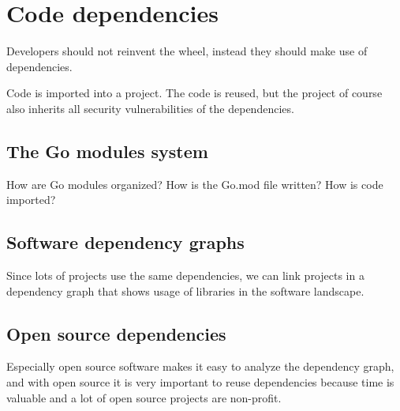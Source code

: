 
\chapter{Code dependencies}\label{ch:code-dependencies}

Developers should not reinvent the wheel, instead they should make use of dependencies.

Code is imported into a project. The code is reused, but the project of course also inherits
all security vulnerabilities of the dependencies.



\section{The Go modules system}\label{sec:go-modules}

How are Go modules organized? How is the Go.mod file written? How is code imported?



\section{Software dependency graphs}\label{sec:dependency-graphs}

Since lots of projects use the same dependencies, we can link projects in a dependency
graph that shows usage of libraries in the software landscape.



\section{Open source dependencies}\label{sec:open-source-dependencies}

Especially open source software makes it easy to analyze the dependency graph, and with
open source it is very important to reuse dependencies because time is valuable and a lot
of open source projects are non-profit.
